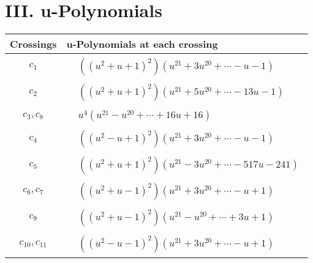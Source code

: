 \documentclass[1p]{elsarticle_modified}
\theoremstyle{definition}
\begin{document}
\newpage\renewcommand{\arraystretch}{1}
\centering \section*{ III. u-Polynomials}
\begin{tabular}{m{50pt}|m{274pt}}
Crossings & \hspace{64pt}u-Polynomials at each crossing \\
\hline $$\begin{aligned}c_{1}\end{aligned}$$&$\begin{aligned}
&((u^2+u+1)^2)(u^{21}+3 u^{20}+\cdots- u-1)
\end{aligned}$\\
\hline $$\begin{aligned}c_{2}\end{aligned}$$&$\begin{aligned}
&((u^2+u+1)^2)(u^{21}+5 u^{20}+\cdots-13 u-1)
\end{aligned}$\\
\hline $$\begin{aligned}c_{3},c_{8}\end{aligned}$$&$\begin{aligned}
&u^4(u^{21}- u^{20}+\cdots+16 u+16)
\end{aligned}$\\
\hline $$\begin{aligned}c_{4}\end{aligned}$$&$\begin{aligned}
&((u^2- u+1)^2)(u^{21}+3 u^{20}+\cdots- u-1)
\end{aligned}$\\
\hline $$\begin{aligned}c_{5}\end{aligned}$$&$\begin{aligned}
&((u^2+u+1)^2)(u^{21}-3 u^{20}+\cdots-517 u-241)
\end{aligned}$\\
\hline $$\begin{aligned}c_{6},c_{7}\end{aligned}$$&$\begin{aligned}
&((u^2+u-1)^2)(u^{21}+3 u^{20}+\cdots- u+1)
\end{aligned}$\\
\hline $$\begin{aligned}c_{9}\end{aligned}$$&$\begin{aligned}
&((u^2+u-1)^2)(u^{21}- u^{20}+\cdots+3 u+1)
\end{aligned}$\\
\hline $$\begin{aligned}c_{10},c_{11}\end{aligned}$$&$\begin{aligned}
&((u^2- u-1)^2)(u^{21}+3 u^{20}+\cdots- u+1)
\end{aligned}$\\
\hline
\end{tabular}\newpage\renewcommand{\arraystretch}{1}
\end{document}
